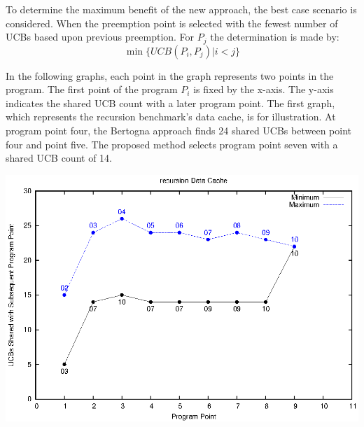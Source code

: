 To determine the maximum benefit of the new approach, the best case
scenario is considered. When the preemption point is selected with the
fewest number of UCBs based upon previous preemption.  For ${P_j}$ the
determination is made by:
\begin{equation*}
  \min\{ UCB(P_i, P_j) \vert i < j \}
\end{equation*}

In the following graphs, each point in the graph represents two points
in the program. The first point of the program ${P_i}$ is fixed by the
x-axis. The y-axis indicates the shared UCB count with a later program
point. The first graph, which represents the recursion benchmark's
data cache, is for illustration. At program point four, the Bertogna
approach finds 24 shared UCBs between point four and point five. The
proposed method selects program point seven with a shared UCB count of
14.
\begin{center}
  \includegraphics[width=\linewidth]{eps/recursion-dcache.eps}
\end{center}

